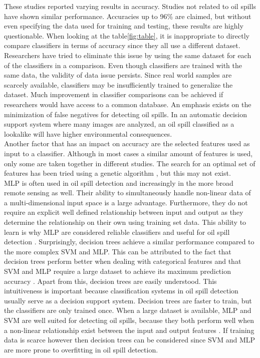 These studies reported varying results in accuracy. Studies not related to oil spills have shown similar performance. Accuracies up to 96\% are claimed\cite{Topouzelis200924}, but without even specifying the data used for training and testing, these results are highly questionable. When looking at the table\ref{fig:table}, it is inappropriate to directly compare classifiers in terms of accuracy since they all use a different dataset. Researchers have tried to eliminate this issue by using the same dataset for each of the classifiers in a comparison\cite{Mera201472}\cite{Xu201414}. Even though classifiers are trained with the same data, the validity of data issue persists. Since real world samples are scarcely available, classifiers may be insufficiently trained to generalize the dataset. Much improvement in classifier comparisons can be achieved if researchers would have access to a common database\cite{Topouzelis200810}. An emphasis exists on the minimization of false negatives for detecting oil spills. In an automatic decision support system where many images are analyzed, an oil spill classified as a lookalike will have higher environmental consequences.
\\
Another factor that has an impact on accuracy are the selected features used as input to a classifier. Although in most cases a similar amount of features is used, only some are taken together in different studies. The search for an optimal set of features has been tried using a genetic algorithm \cite{Topouzelis200930}, but this may not exist.
\\
MLP is often used in oil spill detection and increasingly in the more broad remote sensing as well. Their ability to simultaneously handle non-linear data of a multi-dimensional input space is a large advantage. Furthermore, they do not require an explicit well defined relationship between input and output as they determine the relationship on their own using training set data. This ability to learn is why MLP are considered reliable classifiers and useful for oil spill detection \cite{Delfrate200038}. Surprisingly, decision trees achieve a similar performance compared to the more complex SVM and MLP. This can be attributed to the fact that decision trees perform better when dealing with categorical features and that SVM and MLP require a large dataset to achieve its maximum prediction accuracy \cite{kotsiantis2007supervised}. Apart from this, decision trees are easily understood. This intuitiveness is important because classification systems in oil spill detection usually serve as a decision support system. Decision trees are faster to train, but the classifiers are only trained once. When a large dataset is available, MLP and SVM are well suited for detecting oil spills, because they both perform well when a non-linear relationship exist between the input and output features \cite{kotsiantis2007supervised}. If training data is scarce however then decision trees can be considered since SVM and MLP are more prone to overfitting in oil spill detection\cite{Xu201414}.
